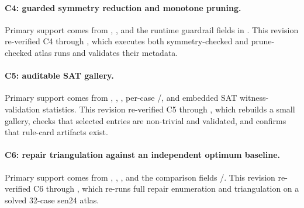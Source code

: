 \paragraph{C4: guarded symmetry reduction and monotone pruning.}
Primary support comes from , , and the runtime guardrail fields in .
This revision re-verified C4 through , which executes both symmetry-checked and prune-checked atlas runs and validates their metadata.

\paragraph{C5: auditable SAT gallery.}
Primary support comes from , , , per-case /, and embedded SAT witness-validation statistics.
This revision re-verified C5 through , which rebuilds a small gallery, checks that selected entries are non-trivial and validated, and confirms that rule-card artifacts exist.

\paragraph{C6: repair triangulation against an independent optimum baseline.}
Primary support comes from , , , and the comparison fields /.
This revision re-verified C6 through , which re-runs full repair enumeration and triangulation on a solved 32-case sen24 atlas.
